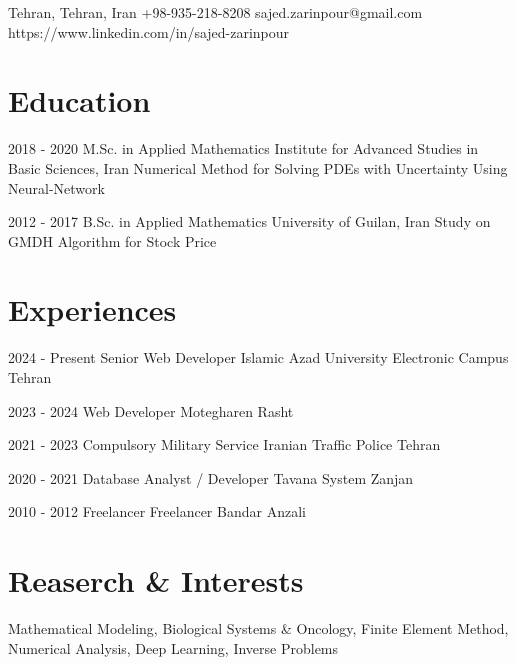\documentclass[10pt, a4paper]{article}
\begin{document}
	\contactInfo
	{Tehran, Tehran, Iran}
	{+98-935-218-8208}
	{sajed.zarinpour@gmail.com}
	{https://www.linkedin.com/in/sajed-zarinpour}

	\section*{Education} 
		\eduEntry
		{2018 - 2020}
		{M.Sc. in Applied Mathematics}
		{Institute for Advanced Studies in Basic Sciences, Iran}
		{Numerical Method for Solving PDEs with Uncertainty Using Neural-Network}
		{ 
			 \\
		}
		
		\eduEntry
		{2012 - 2017}
		{B.Sc. in Applied Mathematics}
		{University of Guilan, Iran}
		{Study on GMDH Algorithm for Stock Price}
		{ 
		}
		
	\section*{Experiences}

		\expEntry
		{2024 - Present}
		{Senior Web Developer}
		{Islamic Azad University Electronic Campus}
		{Tehran}
		{\textcolor{gray}{}}

		\expEntry
		{2023 - 2024}
		{Web Developer}
		{Motegharen}
		{Rasht}
		{\textcolor{gray}{}}
	
		\expEntry
		{2021 - 2023}
		{Compulsory Military Service}
		{Iranian Traffic Police}
		{Tehran}{}
	
		\expEntry
		{2020 - 2021}
		{Database Analyst / Developer}
		{Tavana System}
		{Zanjan}
		{\textcolor{gray}{}}
		
		
		\expEntry
		{2010 - 2012}
		{Freelancer}
		{Freelancer}
		{Bandar Anzali}
		{\textcolor{gray}{}}

	\section*{Reaserch \& Interests}
	\interestslist
	{
		Mathematical Modeling,
		Biological Systems \& Oncology,
		Finite Element Method, 
		Numerical Analysis,
		Deep Learning,
		Inverse Problems
	}
\end{document}

